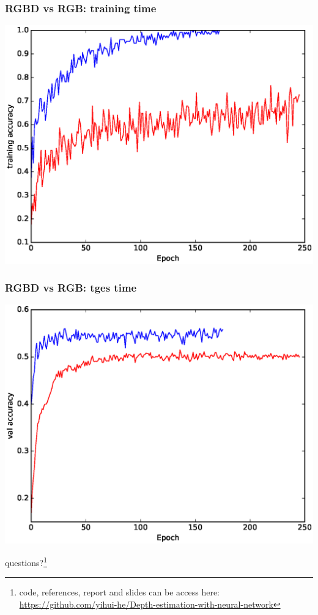 \documentclass{beamer}
\begin{document}
\begin{frame}
\frametitle{RGBD vs RGB: training time}
\includegraphics[width=\linewidth]{together_train.eps}
\end{frame}


\begin{frame}
\frametitle{RGBD vs RGB: tges time}
\includegraphics[width=\linewidth]{together_test.eps}
\end{frame}


\begin{frame}
\Huge{\centerline{questions?\footnote{code, references, report and slides can be access here:
\href{https://github.com/yihui-he/Depth-estimation-with-neural-network}{https://github.com/yihui-he/Depth-estimation-with-neural-network}}}}

\end{frame}
\end{document}
